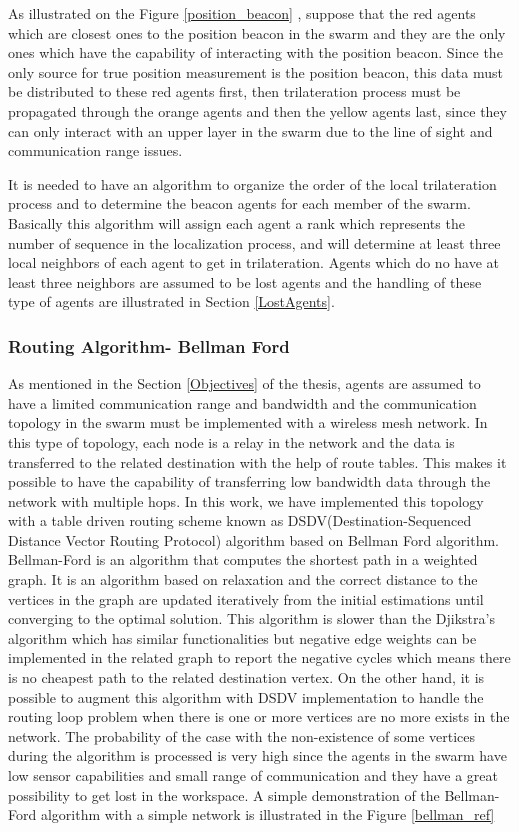 As illustrated on the Figure \ref{position_beacon} , suppose that the red agents which are closest ones to the position beacon in the swarm and they are the only ones which have the capability of interacting with the position beacon. Since the only source for true position measurement is the position beacon, this data must be distributed to these red agents first, then trilateration process must be propagated through the orange agents and then the yellow agents last, since they can only interact with an upper layer in the swarm due to the line of sight and communication range issues.

It is needed to have an algorithm to organize the order of the local trilateration process and to determine the beacon agents for each member of the swarm. Basically this algorithm will assign each agent a rank which represents the number of sequence in the localization process, and will determine at least three local neighbors of each agent to get in trilateration. Agents which do no have at least three neighbors are assumed to be lost agents and the handling of these type of agents are illustrated in Section \ref{LostAgents}.
	
\subsubsection{Routing Algorithm- Bellman Ford}
As mentioned in the Section \ref{Objectives} of the thesis, agents are assumed to have a limited communication range and bandwidth and the communication topology in the swarm must be implemented with a wireless mesh network. In this type of topology, each node is a relay in the network and the data is transferred to the related destination with the help of route tables. This makes it possible to have the capability of transferring low bandwidth data through the network with multiple hops.  In this work, we have implemented this topology with a table driven routing scheme known as DSDV(Destination-Sequenced Distance Vector Routing Protocol) algorithm based on Bellman Ford algorithm. Bellman-Ford is an algorithm that computes the shortest path in a weighted graph. It is an algorithm based on relaxation and the correct distance to the vertices in the graph are updated iteratively from the initial estimations until converging to the optimal solution. This algorithm is slower than the Djikstra's algorithm which has similar functionalities but negative edge weights can be implemented in the related graph to report the negative cycles which means there is no cheapest path to the related destination vertex. On the other hand, it is possible to augment this algorithm with DSDV implementation to handle the routing loop problem when there is one or more vertices are no more exists in the network. The probability of the case with the non-existence of some vertices during the algorithm is processed is very high since the agents in the swarm have low sensor capabilities and small range of communication and they have a great possibility to get lost in the workspace. A simple demonstration of the Bellman-Ford algorithm with a simple network is illustrated in the Figure \ref{bellman_ref}
	

